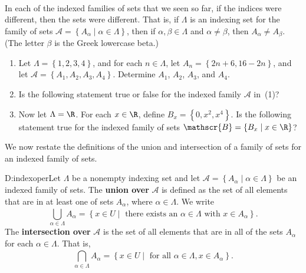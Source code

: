 \begin{prog} \label{prog:indexfamily} \hfill \\
In each of the indexed families of sets that we seen so far, if the indices were different, then the sets were different.  That is, if $\Lambda$ is an indexing set for the family of sets 
$\mathscr{A} = \left\{ A_\alpha \mid \alpha \in \Lambda \right\}$, then if $\alpha, \beta \in \Lambda$ and $\alpha \ne \beta$, then $A_\alpha \ne A_\beta$.  (\note  The letter $\beta$ is the Greek lowercase beta.)

\begin{enumerate}
\item Let $\Lambda = \left\{ 1, 2, 3, 4 \right\}$, and for each $n \in \Lambda$, let 
$A_n = \left\{ 2n + 6, 16 - 2n \right\}$, and let 
$\mathscr{A} = \left\{A_1, A_2, A_3, A_4 \right\}$.  Determine $A_1$, $A_2$, $A_3$, and 
$A_4$.

\item Is the following statement true or false for the indexed family $\mathscr{A}$ in~(1)?

\item Now let $\Lambda = \R$.  For each $x \in \R$, define 
$B_x = \left\{ 0, x^2, x^4 \right\}$.  Is the following statement true for the indexed family of sets $\mathscr{B} = \left\{ B_x \mid x \in \R \right\}$?
\end{enumerate}
\end{prog}
\hbreak


We now restate the definitions of the union and intersection of a family of sets for an indexed family of sets.

\begin{defbox}{D:indexoper}{Let $\Lambda$ be a nonempty indexing set and let 
$\mathscr{A} = \left\{ A_\alpha \mid \alpha \in \Lambda \right\}$ be an indexed family of sets.  The \textbf{union over} $\mathbf{\mathscr{A}}$
%
%
 is defined as the set of all elements that are in at least one of sets $A_\alpha$, where $\alpha \in \Lambda$.  We write
\[
\bigcup_{\alpha \in \Lambda}^{}A_\alpha = \left\{ x \in U \mid \text{ there exists an } 
\alpha \in \Lambda \text{ with } x \in A_\alpha \right\}\!. \label{sym:unionindex}
\]
The \textbf{intersection over} $\mathbf{\mathscr{A}}$
%
%
 is the set of all elements that are in all of the sets $A_\alpha$ for each 
$\alpha \in \Lambda$.  That is,
\[
\bigcap_{\alpha \in \Lambda}^{}A_\alpha = \left\{ x \in U \mid \text{ for all } 
\alpha \in \Lambda,  x \in A_\alpha \right\}\!. \label{sym:interindex}
\]
}
\end{defbox}


